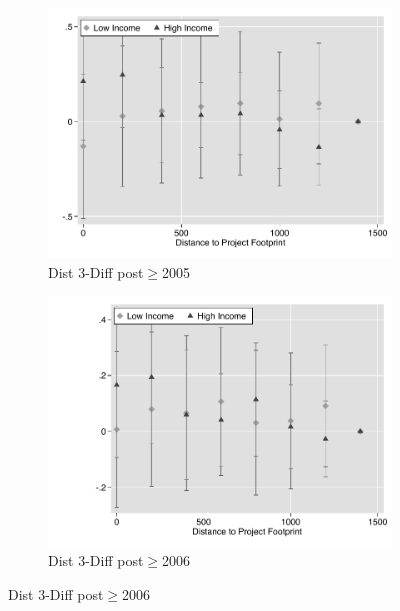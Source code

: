 \documentclass[12pt]{article}
\begin{document}
\begin{figure}
 \begin{subfigure}[b]{0.48\textwidth}
                    \caption[Network2]%
            {{\footnotesize Dist 3-Diff post$\geq$2005}}    
            \label{fig:prefor}
            \centering
            \includegraphics[width=\textwidth,trim={0.3cm .3cm 0.1cm 0cm}, clip=true]{figures/price_dist_3d_no_ctrl_2005}
        \end{subfigure}
        \hfill
 \begin{subfigure}[b]{0.48\textwidth}
                    \caption[Network2]%
            {{\footnotesize Dist 3-Diff post$\geq$2006}}    
            \label{fig:prefor}
            \centering
            \includegraphics[width=\textwidth,trim={0.3cm .3cm 0.1cm 0cm}, clip=true]{figures/price_dist_3d_no_ctrl_2006}

\end{subfigure}
\end{figure}
\end{document}

